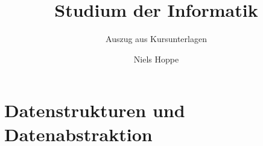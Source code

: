 

\title{Studium der Informatik}
\subtitle{Auszug aus Kursunterlagen}
\author{Niels Hoppe}



\maketitle
\tableofcontents

\chapter{Datenstrukturen und Datenabstraktion}



